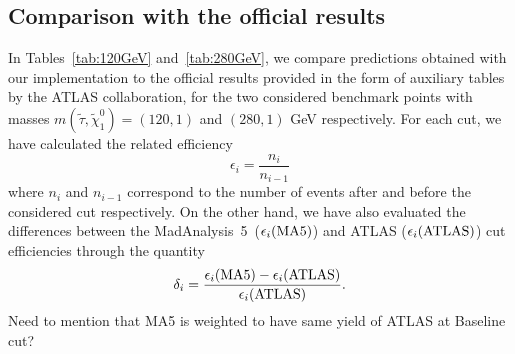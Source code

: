 \documentclass{ws-mpla}
\newcommand{\madanalysis}{{\sc MadAnalysis~5}}
\begin{document}
\subsection{Comparison with the official results}
In Tables~\ref{tab:120GeV} and~\ref{tab:280GeV}, we compare predictions obtained with our implementation to the official results provided in the form of auxiliary tables by the ATLAS collaboration, for the two considered benchmark points with masses $m(\tilde{\tau},\tilde{\chi}^0_1)=(120,1)$ and $(280,1)$ GeV respectively.
For each cut, we have calculated the related efficiency
\begin{equation}
\epsilon_i =\frac{n_i}{n_{i-1}}
\end{equation}
where $ n_i $ and $ n_{i-1} $ correspond to the number of events after and before the considered cut respectively.
%
On the other hand, we have also evaluated the differences between the \madanalysis\ ($\epsilon_i ({\rm MA5})$) and ATLAS ($\epsilon_i ({\rm ATLAS})$) cut efficiencies through the quantity
\begin{equation}
\delta_i = \frac{\epsilon_i ({\rm MA5})-\epsilon_i ({\rm ATLAS})}{\epsilon_i ({\rm ATLAS})}.
\end{equation}
{\color{red}Need to mention that MA5 is weighted to have same yield of ATLAS at Baseline cut?}
\end{document}

